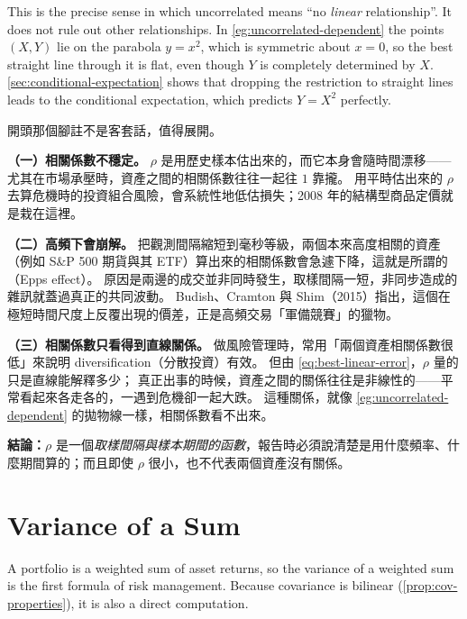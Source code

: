 This is the precise sense in which uncorrelated means ``no \emph{linear} relationship''.
It does not rule out other relationships.
In \autoref{eg:uncorrelated-dependent} the points $(X,Y)$ lie on the parabola $y=x^{2}$, which is symmetric about $x=0$, so the best straight line through it is flat, even though $Y$ is completely determined by $X$.
\autoref{sec:conditional-expectation} shows that dropping the restriction to straight lines leads to the conditional expectation, which predicts $Y=X^{2}$ perfectly.

\begin{remark}
	開頭那個腳註不是客套話，值得展開。

	\textbf{（一）相關係數不穩定。}
	$\rho$ 是用歷史樣本估出來的，而它本身會隨時間漂移——尤其在市場承壓時，資產之間的相關係數往往一起往 $1$ 靠攏。
	用平時估出來的 $\rho$ 去算危機時的投資組合風險，會系統性地低估損失；2008 年的結構型商品定價就是栽在這裡。

	\textbf{（二）高頻下會崩解。}
	把觀測間隔縮短到毫秒等級，兩個本來高度相關的資產（例如 S\&P 500 期貨與其 ETF）算出來的相關係數會急遽下降，這就是所謂的 （Epps effect）。
	原因是兩邊的成交並非同時發生，取樣間隔一短，非同步造成的雜訊就蓋過真正的共同波動。
	Budish、Cramton 與 Shim（2015）指出，這個在極短時間尺度上反覆出現的價差，正是高頻交易「軍備競賽」的獵物。

	\textbf{（三）相關係數只看得到直線關係。}
	做風險管理時，常用「兩個資產相關係數很低」來說明 diversification（分散投資）有效。
	但由 \eqref{eq:best-linear-error}，$\rho$ 量的只是直線能解釋多少；
	真正出事的時候，資產之間的關係往往是非線性的——平常看起來各走各的，一遇到危機卻一起大跌。
	這種關係，就像 \autoref{eg:uncorrelated-dependent} 的拋物線一樣，相關係數看不出來。

	\textbf{結論：}$\rho$ 是一個\emph{取樣間隔與樣本期間的函數}，報告時必須說清楚是用什麼頻率、什麼期間算的；而且即使 $\rho$ 很小，也不代表兩個資產沒有關係。
\end{remark}
\suppend

\section{Variance of a Sum}
\label{sec:var-sum}


A portfolio is a weighted sum of asset returns, so the variance of a weighted sum is the first formula of risk management.
Because covariance is bilinear (\autoref{prop:cov-properties}), it is also a direct computation.

